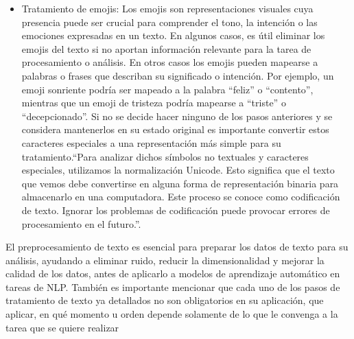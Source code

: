 \begin{itemize}
	\item Tratamiento de emojis: Los emojis son representaciones visuales cuya presencia puede ser crucial para comprender el tono, la intención o las emociones expresadas en un texto. En algunos casos, es útil eliminar los emojis del texto si no aportan información relevante para la tarea de procesamiento o análisis. En otros casos los emojis pueden mapearse a palabras o frases que describan su significado o intención. Por ejemplo, un emoji sonriente podría ser mapeado a la palabra ``feliz'' o ``contento'', mientras que un emoji de tristeza podría mapearse a ``triste'' o ``decepcionado''. 
Si no se decide hacer ninguno de los pasos anteriores y se considera mantenerlos en su estado original es importante convertir estos caracteres especiales a una representación más simple para su tratamiento.``Para analizar dichos símbolos no textuales y caracteres especiales, utilizamos la normalización Unicode. Esto significa que el texto que vemos debe convertirse en alguna forma de representación binaria para almacenarlo en una computadora. Este proceso se conoce como codificación de texto. Ignorar los problemas de codificación puede provocar errores de procesamiento en el futuro.''\cite[p. 45]{vajjala2020practical}.

\end{itemize}

El preprocesamiento de texto es esencial para preparar los datos de texto para su análisis, ayudando a eliminar ruido, reducir la dimensionalidad y mejorar la calidad de los datos, antes de aplicarlo a modelos de aprendizaje automático en tareas de NLP. También es importante mencionar que cada uno de los pasos de tratamiento de texto ya detallados no son obligatorios en su aplicación, que aplicar, en qué momento u orden depende solamente de lo que le convenga a la tarea que se quiere realizar 
	
	
	
